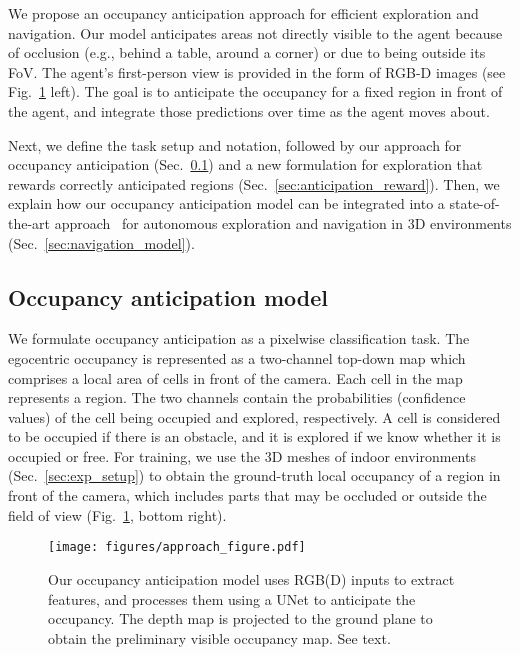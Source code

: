 \documentclass[runningheads]{llncs}
\begin{document}
We propose an occupancy anticipation approach for efficient exploration and navigation. Our model anticipates areas not directly visible to the agent because of occlusion (e.g., behind a table, around a corner) or due to being outside its FoV. The agent's first-person view is provided in the form of RGB-D images (see Fig.~\ref{fig:approach_figure} left). The goal is to anticipate the occupancy for a fixed region in front of the agent, and integrate those predictions over time as the agent moves about.

Next, we define the task setup and notation, followed by our approach for occupancy anticipation (Sec.~\ref{sec:occupancy_model}) and a new formulation for exploration that rewards correctly anticipated regions (Sec.~\ref{sec:anticipation_reward}). Then, we explain how our occupancy anticipation model can be integrated into a state-of-the-art approach~\cite{chaplot2020learning} for autonomous  exploration and navigation in 3D environments (Sec.~\ref{sec:navigation_model}).


\subsection{Occupancy anticipation model}\label{sec:occupancy_model}

We formulate occupancy anticipation as a pixelwise classification task. The egocentric occupancy is represented as a two-channel top-down map  which comprises a local area of  cells in front of the camera. Each cell in the map represents a  region. The two channels contain the probabilities (confidence values) of the cell being occupied and explored, respectively. A cell is considered to be occupied if there is an obstacle, and it is explored if we know whether it is occupied or free. For training, we use the 3D meshes of indoor environments (Sec.~\ref{sec:exp_setup}) to obtain the ground-truth local occupancy of a  region in front of the camera, which includes parts that may be occluded or outside the field of view (Fig.~\ref{fig:approach_figure}, bottom right). 

\begin{figure}[t]
    \centering
    \texttt{[image: figures/approach\_figure.pdf]}
    \caption{\small Our occupancy anticipation model uses RGB(D) inputs to extract features, and processes them using a UNet to anticipate the occupancy. The depth map is projected to the ground plane to obtain the preliminary visible occupancy map.  See text.}  
    \label{fig:approach_figure}
\end{figure}
\end{document}
